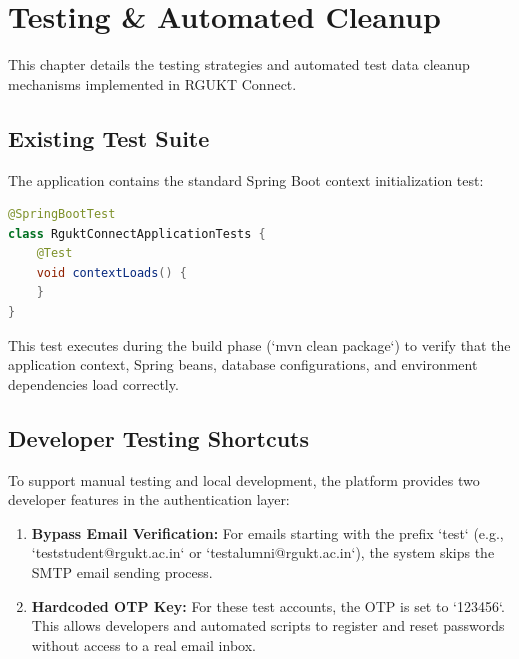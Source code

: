 \chapter{Testing \& Automated Cleanup}
\label{ch:testing}

This chapter details the testing strategies and automated test data cleanup mechanisms implemented in RGUKT Connect.

\section{Existing Test Suite}
The application contains the standard Spring Boot context initialization test:
\begin{lstlisting}[language=java]
@SpringBootTest
class RguktConnectApplicationTests {
    @Test
    void contextLoads() {
    }
}
\end{lstlisting}

This test executes during the build phase (`mvn clean package`) to verify that the application context, Spring beans, database configurations, and environment dependencies load correctly.

\section{Developer Testing Shortcuts}
To support manual testing and local development, the platform provides two developer features in the authentication layer:
\begin{enumerate}
    \item \textbf{Bypass Email Verification:} For emails starting with the prefix `test` (e.g., `teststudent@rgukt.ac.in` or `testalumni@rgukt.ac.in`), the system skips the SMTP email sending process.
    \item \textbf{Hardcoded OTP Key:} For these test accounts, the OTP is set to `123456`. This allows developers and automated scripts to register and reset passwords without access to a real email inbox.
\end{enumerate}

